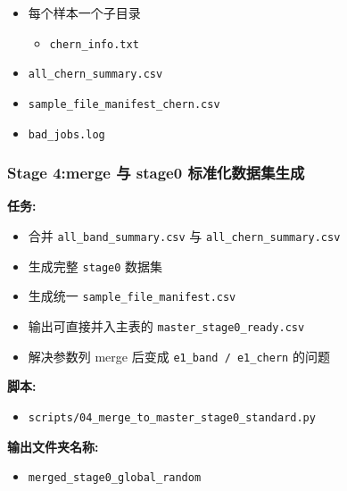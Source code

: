 \documentclass[lang=cn,scheme=chinese,color=blue,device=normal,toc=onecol,math=cm]{elegantbook}
\begin{document}
\begin{itemize}
\item 每个样本一个子目录 
\begin{itemize}
\item \texttt{chern\_\allowbreak{}info.txt}
\end{itemize}
\item \texttt{all\_\allowbreak{}chern\_\allowbreak{}summary.csv}
\item \texttt{sample\_\allowbreak{}file\_\allowbreak{}manifest\_\allowbreak{}chern.csv}
\item \texttt{bad\_\allowbreak{}jobs.log}
\end{itemize}


\subsubsection{Stage 4:merge 与 stage0 标准化数据集生成}


\textbf{任务:}\par


\begin{itemize}
\item 合并 \texttt{all\_\allowbreak{}band\_\allowbreak{}summary.csv} 与 \texttt{all\_\allowbreak{}chern\_\allowbreak{}summary.csv}
\item 生成完整 \texttt{stage0} 数据集
\item 生成统一 \texttt{sample\_\allowbreak{}file\_\allowbreak{}manifest.csv}
\item 输出可直接并入主表的 \texttt{master\_\allowbreak{}stage0\_\allowbreak{}ready.csv}
\item 解决参数列 merge 后变成 \texttt{e1\_\allowbreak{}band /\allowbreak{} e1\_\allowbreak{}chern} 的问题
\end{itemize}


\textbf{脚本:}\par


\begin{itemize}
\item \texttt{scripts/\allowbreak{}04\_\allowbreak{}merge\_\allowbreak{}to\_\allowbreak{}master\_\allowbreak{}stage0\_\allowbreak{}standard.py}
\end{itemize}


\textbf{输出文件夹名称:}\par


\begin{itemize}
\item \texttt{merged\_\allowbreak{}stage0\_\allowbreak{}global\_\allowbreak{}random}
\end{itemize}
\end{document}
